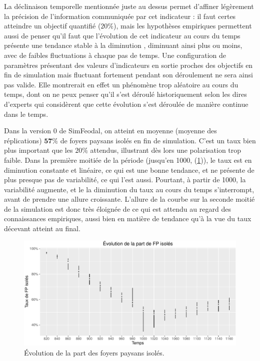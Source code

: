 La \og déclinaison temporelle\fg{} mentionnée juste au dessus permet d'affiner légèrement la précision de l'information communiquée par cet indicateur :
il faut certes atteindre un objectif quantifié ($20\%$), mais les hypothèses empiriques permettent aussi de penser qu'il faut que l'évolution de cet indicateur au cours du temps présente une tendance stable à la diminution
, diminuant ainsi plus ou moins, avec de faibles fluctuations à chaque pas de temps.
Une configuration de paramètres présentant des valeurs d'indicateurs en sortie proches des objectifs en fin de simulation mais fluctuant fortement pendant son déroulement ne sera ainsi pas valide.
Elle montrerait en effet  un phénomène trop aléatoire au cours du temps, dont on ne peux penser qu'il s'est déroulé historiquement selon les dires d'experts qui considèrent que cette évolution s'est déroulée de manière continue dans le temps.

\begin{mdframed}[backgroundcolor=gray!10,footnoteinside=false]

Dans la version 0 de SimFeodal, on atteint en moyenne (moyenne des réplications) $\textbf{57\%}$ de foyers paysans isolés en fin de simulation.
C'est un taux bien plus important que les $20\%$ attendus, illustrant dès lors une polarisation trop faible.
Dans la première moitiée de la période (jusqu'en 1000, (\cref{fig:taux-isoles-v0})), le taux est en diminution constante et linéaire, ce qui est une bonne tendance, et ne présente de plus presque pas de variabilité, ce qui l'est aussi.
Pourtant, à partir de 1000, la variabilité augmente, et le la diminution du taux au cours du temps s'interrompt, avant de prendre une allure croissante.
L'allure de la courbe sur la seconde moitié de la simulation est donc très éloignée de ce qui est attendu au regard des connaissances empiriques, aussi bien en matière de tendance qu'à la vue du taux décevant atteint au final.
\end{mdframed}

\begin{figure}[H]
\captionsetup{width=\linewidth}
\includegraphics[width=\linewidth]{img/resultats/v0_taux_FP_isoles.pdf}
\caption{Évolution de la part des foyers paysans isolés.}
\label{fig:taux-isoles-v0}
\end{figure}


